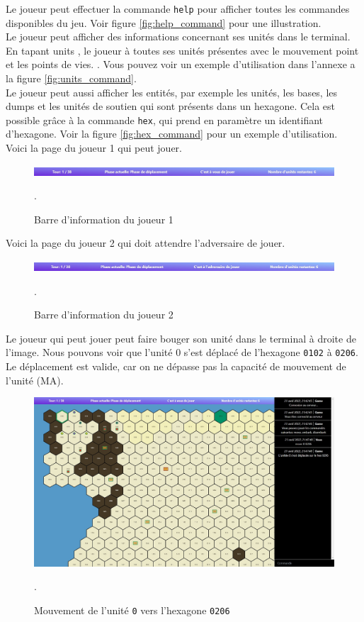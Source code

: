 Le joueur peut effectuer la commande {\tt help}  pour afficher toutes les commandes disponibles du jeu. Voir figure \ref{fig:help_command} pour une illustration.\\

Le joueur peut afficher des informations concernant ses unités dans le terminal.
En tapant \og units \fg{}, le joueur à toutes ses unités présentes avec le mouvement point et  les points de vies.
. Vous pouvez voir un exemple d'utilisation dans l'annexe a la figure \ref{fig:units_command}. \\

Le joueur peut aussi afficher les entités, par exemple les unités, les bases, les dumps et les unités de soutien qui sont présents dans un hexagone.
Cela est possible grâce à la commande {\tt hex}, qui prend en paramètre un identifiant d'hexagone. Voir la figure \ref{fig:hex_command} pour un exemple d'utilisation.\\


Voici la page du joueur 1 qui peut jouer.\\
\begin{figure}[H]
    \centering
    \includegraphics[scale=0.6]{data/player_1_acces.jpg}
    \caption{Barre d'information du joueur 1}.
\end{figure}

Voici la page du joueur 2 qui doit attendre l'adversaire de jouer.\\
\begin{figure}[H]
    \centering
    \includegraphics[scale=0.6]{data/joueur_2.jpg}
    \caption{Barre d'information du joueur 2}.
\end{figure}

Le joueur qui peut jouer peut faire bouger son unité dans le terminal à droite de l'image.
Nous pouvons voir que l'unité 0 s'est déplacé de l'hexagone \lstinline{0102} à \lstinline{0206}. Le déplacement est valide, car on ne dépasse pas la capacité de mouvement de l'unité (MA).\\

\begin{figure}[H]
    \centering
    \includegraphics[scale=0.45]{data/move_unit_player_1.jpg}
    \caption{Mouvement de l'unité \lstinline{0} vers l'hexagone \lstinline{0206}}.
\end{figure}

